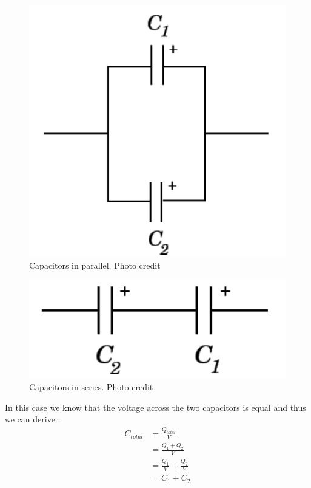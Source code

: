 \documentclass[oneside,12pt]{amsart}
\begin{document}
	\begin{figure}[h]
		\includegraphics[width=\smallgraph,scale=0.01]{Parallel.png}
		\caption{Capacitors in parallel. Photo credit \cite{cap}}
		\label{Parallel}
	\end{figure}
\begin{figure}[h]
	\includegraphics[width=\smallgraph,scale=0.01]{Series.png}
	\caption{Capacitors in series. Photo credit \cite{cap}}
	\label{Series}
\end{figure}

	\indent In this case we know that the voltage across the two capacitors is equal\cite{cap} and thus we can derive :
	\begin{align*}
	C_{total} &= \frac{Q_{total}}{V} \\
	&=\frac{Q_1+Q_2}{V}\\
	&= \frac{Q_1}{V} + \frac{Q_2}{V}\\
	&= C_1 + C_2
	\end{align*}
	
\end{document}
